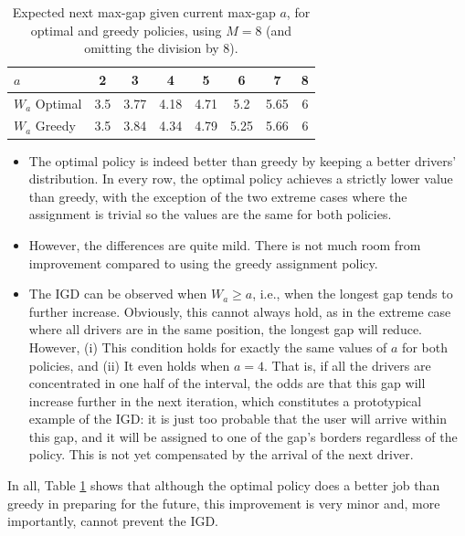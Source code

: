 \documentclass[12pt,english]{article}
\begin{document}
{\begin{table}[ht]
\centering
\begin{tabular}{l|ccccccc}
\hline
$a$ &2& 3 & 4 & 5 & 6 & 7 & 8 \\
\hline
$W_a$ Optimal & 3.5 & 3.77 & 4.18 & 4.71 & 5.2 & 5.65 & 6 \\
$W_a$ Greedy & 3.5 & 3.84 & 4.34 & 4.79 & 5.25 & 5.66 & 6 \\
\hline
\end{tabular}
\caption{Expected next max-gap given current max-gap $a$, for optimal and greedy policies, using $M=8$ (and omitting the division by 8).}
\label{tab:expected_max_gap}
\end{table}


\begin{itemize}
    \item The optimal policy is indeed better than greedy by keeping a better drivers' distribution. In every row, the optimal policy achieves a strictly lower value than greedy, with the exception of the two extreme cases where the assignment is trivial so the values are the same for both policies.
    \item However, the differences are quite mild. There is not much room from improvement compared to using the greedy assignment policy.
    \item The IGD can be observed when $W_a \geq a$, i.e., when the longest gap tends to further increase. Obviously, this cannot always hold, as in the extreme case where all drivers are in the same position, the longest gap will reduce. However, (i) This condition holds for exactly the same values of $a$ for both policies, and (ii) It even holds when $a=4$. That is, if all the drivers are concentrated in one half of the interval, the odds are that this gap will increase further in the next iteration, which constitutes a prototypical example of the IGD: it is just too probable that the user will arrive within this gap, and it will be assigned to one of the gap's borders regardless of the policy. This is not yet compensated by the arrival of the next driver.
\end{itemize}

In all, Table \ref{tab:expected_max_gap} shows that although the optimal policy does a better job than greedy in preparing for the future, this improvement is very minor and, more importantly, cannot prevent the IGD.



}
\end{document}
